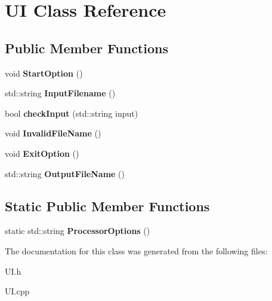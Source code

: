 \hypertarget{classUI}{}\section{UI Class Reference}
\label{classUI}
\subsection*{Public Member Functions}
\begin{DoxyCompactItemize}
\item 
\mbox{\label{classUI_ade684e1af6cdcc9ad9a9f4049294d5f7}} 
void {\bfseries Start\+Option} ()
\item 
\mbox{\label{classUI_aac4ec5438f211612234d8f9be155eaf2}} 
std\+::string {\bfseries Input\+Filename} ()
\item 
\mbox{\label{classUI_a81e54c22892df22c6b67a10e4d0e58e6}} 
bool {\bfseries check\+Input} (std\+::string input)
\item 
\mbox{\label{classUI_a8f4736f8a5097a1f234678ac85544b28}} 
void {\bfseries Invalid\+File\+Name} ()
\item 
\mbox{\label{classUI_a8d1d1f3df8d204f641c085a4d3730c1b}} 
void {\bfseries Exit\+Option} ()
\item 
\mbox{\label{classUI_ad5a96cf0e114c4dac4a4d7958dd98c4a}} 
std\+::string {\bfseries Output\+File\+Name} ()
\end{DoxyCompactItemize}
\subsection*{Static Public Member Functions}
\begin{DoxyCompactItemize}
\item 
\mbox{\label{classUI_a3af627515035a845a98b24d7463da5dc}} 
static std\+::string {\bfseries Processor\+Options} ()
\end{DoxyCompactItemize}


The documentation for this class was generated from the following files\+:\begin{DoxyCompactItemize}
\item 
U\+I.\+h\item 
U\+I.\+cpp\end{DoxyCompactItemize}
